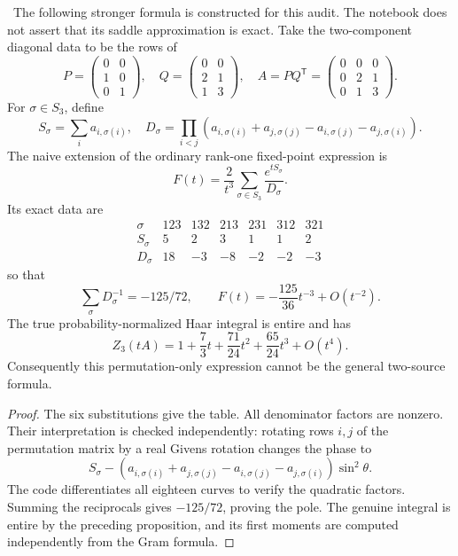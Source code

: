 \begin{example}\oursComputed\ 
The following stronger formula is constructed for this audit.
The notebook does not assert that its saddle approximation is exact.
Take the two-component diagonal data to be the rows of
\[
 P=\begin{pmatrix}0&0\\1&0\\0&1\end{pmatrix},\quad
 Q=\begin{pmatrix}0&0\\2&1\\1&3\end{pmatrix},\quad
 A=PQ^{\mathsf T}=
   \begin{pmatrix}0&0&0\\0&2&1\\0&1&3\end{pmatrix}.
\]
For \(\sigma\in S_3\), define
\[
 S_\sigma=\sum_i a_{i,\sigma(i)},\quad
 D_\sigma=\prod_{i<j}
  (a_{i,\sigma(i)}+a_{j,\sigma(j)}
                  -a_{i,\sigma(j)}-a_{j,\sigma(i)}).
\]
The naive extension of the ordinary rank-one fixed-point expression is
\[
 F(t)=\frac2{t^3}\sum_{\sigma\in S_3}
                   \frac{e^{tS_\sigma}}{D_\sigma}.
\]
Its exact data are
\[
\begin{array}{c|rrrrrr}
 \sigma&123&132&213&231&312&321\\ \hline
 S_\sigma&5&2&3&1&1&2\\
 D_\sigma&18&-3&-8&-2&-2&-3
\end{array}
\]
so that
\[
 \sum_\sigma D_\sigma^{-1}=-125/72,\qquad
 F(t)=-\frac{125}{36}t^{-3}+O(t^{-2}).
\]
The true probability-normalized Haar integral is entire and has
\[
 Z_3(tA)=1+\frac73t+\frac{71}{24}t^2+\frac{65}{24}t^3+O(t^4).
\]
Consequently this permutation-only expression cannot be the general
two-source formula.
\end{example}
\begin{proof}
The six substitutions give the table. All denominator factors are
nonzero. Their interpretation is checked independently: rotating
rows \(i,j\) of the permutation matrix by a real Givens rotation
changes the phase to
\[
 S_\sigma-
 (a_{i,\sigma(i)}+a_{j,\sigma(j)}
      -a_{i,\sigma(j)}-a_{j,\sigma(i)})\sin^2\theta.
\]
The code differentiates all eighteen curves to verify the quadratic
factors. Summing the reciprocals gives \(-125/72\), proving the pole.
The genuine integral is entire by the preceding proposition, and
its first moments are computed independently from the Gram formula.
\end{proof}

